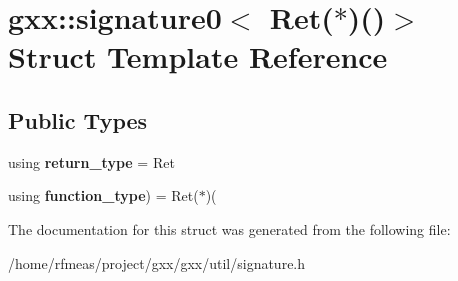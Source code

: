 \hypertarget{structgxx_1_1signature0_3_01Ret_07_5_08_07_08_4}{}\section{gxx\+:\+:signature0$<$ Ret($\ast$)()$>$ Struct Template Reference}
\label{structgxx_1_1signature0_3_01Ret_07_5_08_07_08_4}
\subsection*{Public Types}
\begin{DoxyCompactItemize}
\item 
using {\bfseries return\+\_\+type} = Ret\hypertarget{structgxx_1_1signature0_3_01Ret_07_5_08_07_08_4_a13633d011e7eea1e3b6e1b07d645f4df}{}\label{structgxx_1_1signature0_3_01Ret_07_5_08_07_08_4_a13633d011e7eea1e3b6e1b07d645f4df}

\item 
using {\bfseries function\+\_\+type}) = Ret($\ast$)(\hypertarget{structgxx_1_1signature0_3_01Ret_07_5_08_07_08_4_ae8c37224fca72b063129bf024860fc0b}{}\label{structgxx_1_1signature0_3_01Ret_07_5_08_07_08_4_ae8c37224fca72b063129bf024860fc0b}

\end{DoxyCompactItemize}


The documentation for this struct was generated from the following file\+:\begin{DoxyCompactItemize}
\item 
/home/rfmeas/project/gxx/gxx/util/signature.\+h\end{DoxyCompactItemize}
